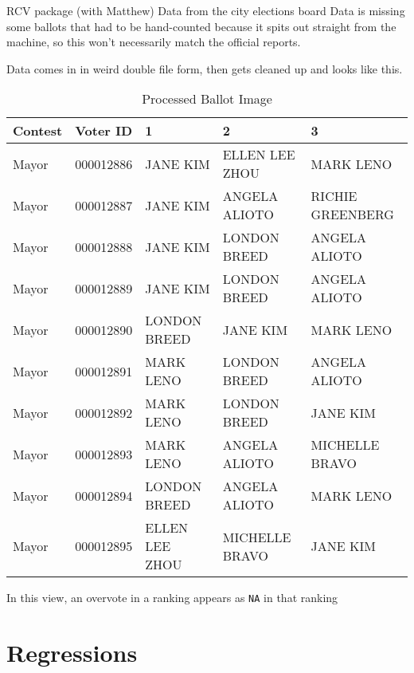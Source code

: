 \documentclass[12pt,twoside]{reedthesis}
\begin{document}
RCV package (with Matthew)
Data from the city elections board
Data is missing some ballots that had to be hand-counted because it spits out straight from the machine, so this won't necessarily match the official reports.

Data comes in in weird double file form, then gets cleaned up and looks like this.
\begin{longtable}{lllll}
\caption{\label{tab:unnamed-chunk-10}Processed Ballot Image}\\
\toprule
Contest & Voter ID & 1 & 2 & 3\\
\midrule
Mayor & 000012886 & JANE KIM & ELLEN LEE ZHOU & MARK LENO\\
Mayor & 000012887 & JANE KIM & ANGELA ALIOTO & RICHIE GREENBERG\\
Mayor & 000012888 & JANE KIM & LONDON BREED & ANGELA ALIOTO\\
Mayor & 000012889 & JANE KIM & LONDON BREED & ANGELA ALIOTO\\
Mayor & 000012890 & LONDON BREED & JANE KIM & MARK LENO\\
\addlinespace
Mayor & 000012891 & MARK LENO & LONDON BREED & ANGELA ALIOTO\\
Mayor & 000012892 & MARK LENO & LONDON BREED & JANE KIM\\
Mayor & 000012893 & MARK LENO & ANGELA ALIOTO & MICHELLE BRAVO\\
Mayor & 000012894 & LONDON BREED & ANGELA ALIOTO & MARK LENO\\
Mayor & 000012895 & ELLEN LEE ZHOU & MICHELLE BRAVO & JANE KIM\\
\bottomrule
\end{longtable}
In this view, an overvote in a ranking appears as \texttt{NA} in that ranking

\hypertarget{regressions}{%
\section{Regressions}\label{regressions}}
\end{document}
